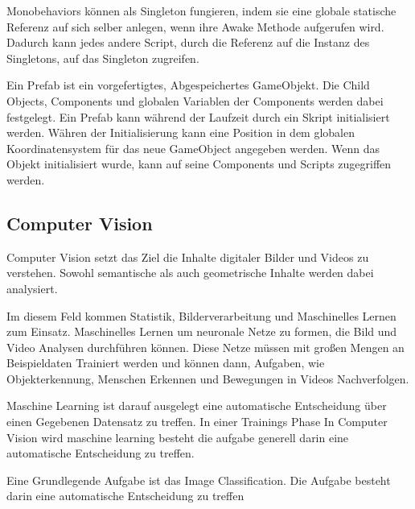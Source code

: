 Monobehaviors können als Singleton fungieren, indem sie eine globale statische Referenz auf sich selber anlegen, wenn ihre Awake Methode aufgerufen wird. Dadurch kann jedes andere Script, durch die Referenz auf die Instanz des Singletons, auf das Singleton zugreifen.

Ein Prefab ist ein vorgefertigtes, Abgespeichertes GameObjekt. Die Child Objects, Components und globalen Variablen der Components werden dabei festgelegt. Ein Prefab kann während der Laufzeit durch ein Skript initialisiert werden. Währen der Initialisierung kann eine Position in dem globalen Koordinatensystem für das neue GameObject angegeben werden. Wenn das Objekt initialisiert wurde, kann auf seine Components und Scripts zugegriffen werden.

\subsection{Computer Vision}
Computer Vision setzt das Ziel die Inhalte digitaler Bilder und Videos zu verstehen. Sowohl semantische als auch geometrische Inhalte werden dabei analysiert. 

Im diesem Feld kommen Statistik, Bilderverarbeitung und Maschinelles Lernen zum Einsatz. Maschinelles Lernen  um neuronale Netze zu formen, die Bild und Video Analysen durchführen können. Diese Netze müssen mit großen Mengen an Beispieldaten Trainiert werden und können dann, Aufgaben, wie Objekterkennung, Menschen Erkennen und Bewegungen in Videos Nachverfolgen.\citep{intortodeeplearingmedical}

Maschine Learning ist darauf ausgelegt eine automatische Entscheidung über einen Gegebenen Datensatz zu treffen. In einer Trainings Phase In Computer Vision wird maschine learning besteht die aufgabe generell darin eine automatische Entscheidung zu treffen. 


Eine Grundlegende Aufgabe ist das Image Classification. Die Aufgabe besteht darin eine automatische Entscheidung zu treffen
%
%
%

